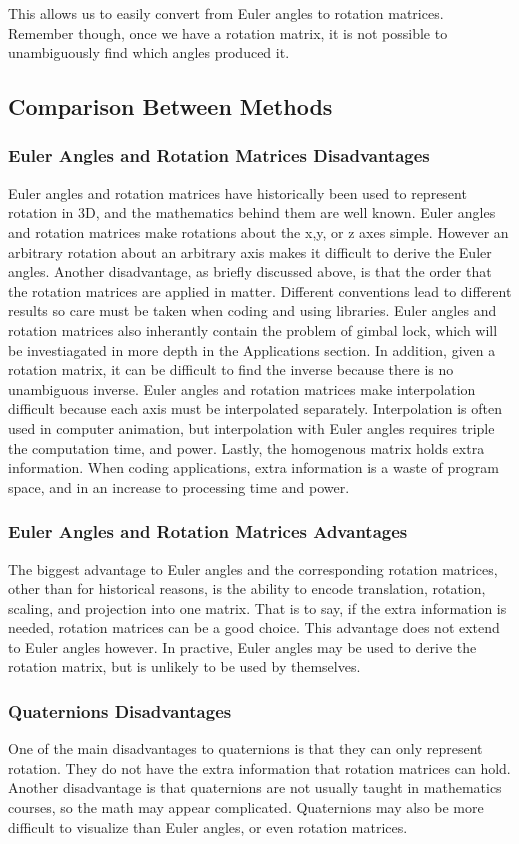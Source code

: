 This allows us to easily convert from Euler angles to rotation matrices.
Remember though, once we have a rotation matrix, it is not possible to unambiguously find which angles produced it.


\subsection{Comparison Between Methods}
\subsubsection{Euler Angles and Rotation Matrices Disadvantages}
Euler angles and rotation matrices have historically been used to represent rotation in 3D, and the mathematics behind them are well known.
Euler angles and rotation matrices make rotations about the x,y, or z axes simple.
However an arbitrary rotation about an arbitrary axis makes it difficult to derive the Euler angles.
Another disadvantage, as briefly discussed above, is that the order that the rotation matrices are applied in matter.
Different conventions lead to different results so care must be taken when coding and using libraries.
Euler angles and rotation matrices also inherantly contain the problem of gimbal lock, which will be investiagated in more depth in the Applications section.
In addition, given a rotation matrix, it can be difficult to find the inverse because there is no unambiguous inverse.
Euler angles and rotation matrices make interpolation difficult because each axis must be interpolated separately.
Interpolation is often used in computer animation, but interpolation with Euler angles requires triple the computation time, and power.
Lastly, the homogenous matrix holds extra information.
When coding applications, extra information is a waste of program space, and in an increase to processing time and power.
\subsubsection{Euler Angles and Rotation Matrices Advantages}
The biggest advantage to Euler angles and the corresponding rotation matrices, other than for historical reasons, is the ability to encode translation, rotation, scaling, and projection into one matrix.
That is to say, if the extra information is needed, rotation matrices can be a good choice.
This advantage does not extend to Euler angles however.
In practive, Euler angles may be used to derive the rotation matrix, but is unlikely to be used by themselves.
\subsubsection{Quaternions Disadvantages}
One of the main disadvantages to quaternions is that they can only represent rotation.
They do not have the extra information that rotation matrices can hold.
Another disadvantage is that quaternions are not usually taught in mathematics courses, so the math may appear complicated.
Quaternions may also be more difficult to visualize than Euler angles, or even rotation matrices.

